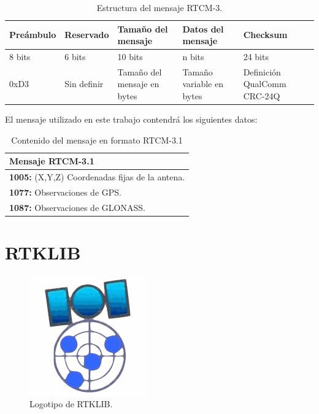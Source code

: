 \begin{table}[!htb]
\begin{center}
\caption{Estructura del mensaje RTCM-3.}
\label{Tab:RTCM-Struct}
\begin{tabular}{|l|l|l|l|l|}
	\hline
	\textbf{\small Preámbulo}& \textbf{\small Reservado}& \textbf{\small Tamaño del mensaje}& \textbf{\small Datos del mensaje}& \textbf{\small Checksum}\\
	\hline
	8 bits & 6 bits & 10 bits & n bits & 24 bits \\
	\hline
	0xD3 & \parbox[t]{1.9cm}{Sin definir} & \parbox[t]{2.9cm}{Tamaño del mensaje en bytes} & \parbox[t]{2.9cm}{Tamaño variable en bytes} & \parbox[t]{2.05cm}{Definición QualComm CRC-24Q}\\
	\hline
\end{tabular}
\end{center}
\end{table}

El mensaje utilizado en este trabajo contendrá los siguientes datos: \\

\begin{table}[!htb]
\begin{center}
\caption{Contenido del mensaje en formato RTCM-3.1}
\begin{tabular}{|l|}
	\hline
	\textbf{Mensaje RTCM-3.1}\\
	\hline
	\tabitem \textbf{1005:} (X,Y,Z) Coordenadas fijas de la antena. \\
	\tabitem \textbf{1077:} Observaciones de GPS. \\
	\tabitem \textbf{1087:} Observaciones de GLONASS.\footnotemark \\
	\hline
\end{tabular}
\end{center}
\end{table}


\section{RTKLIB}

\begin{figure}[H]
\centering
\includegraphics[scale=1.8]{Figures/rtklib}
\caption[Logotipo de RTKLIB.]{Logotipo de RTKLIB\footnotemark.}
\label{fig:rtklib}
\end{figure}

